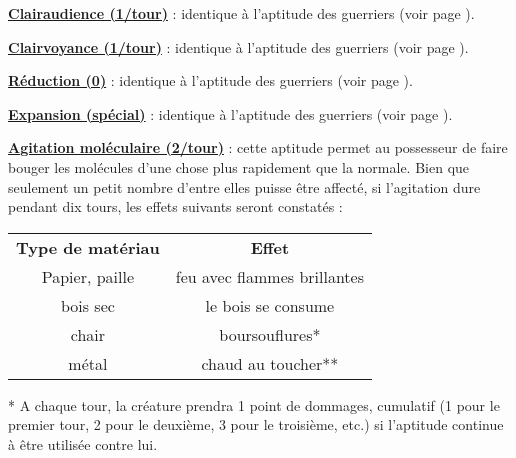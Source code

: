 \bigskip

\textbf{\uline{Clairaudience (1/tour)}} : identique à l'aptitude des guerriers (voir page \pageref{guerrier-clairaudience}).

\bigskip

\textbf{\uline{Clairvoyance (1/tour)}} : identique à l'aptitude des guerriers (voir page \pageref{guerrier-clairvoyance}).

\bigskip

\textbf{\uline{Réduction (0)}} : identique à l'aptitude des guerriers (voir page \pageref{guerrier-reduction}).

\bigskip

\textbf{\uline{Expansion (spécial)}} : identique à l'aptitude des guerriers (voir page \pageref{guerrier-expansion}).

\bigskip

\label{magicien-agitation-mol}\textbf{\uline{Agitation moléculaire (2/tour)}} : cette aptitude permet au possesseur de faire bouger les molécules d'une chose plus rapidement que la normale. Bien que seulement un petit nombre d'entre elles puisse être affecté, si l'agitation dure pendant dix tours, les effets suivants seront constatés :

\medskip

\begin{tabular}{cc}
\textbf{Type de matériau}   & \textbf{Effet} \\
Papier, paille              & feu avec flammes brillantes \\
bois sec                    & le bois se consume \\
chair                       & boursouflures* \\
métal                       & chaud au toucher** \\
\end{tabular}

\bigskip

* A chaque tour, la créature prendra 1 point de dommages, cumulatif (1 pour le premier tour, 2 pour le deuxième, 3 pour le troisième, etc.) si l'aptitude continue à être utilisée contre lui.

